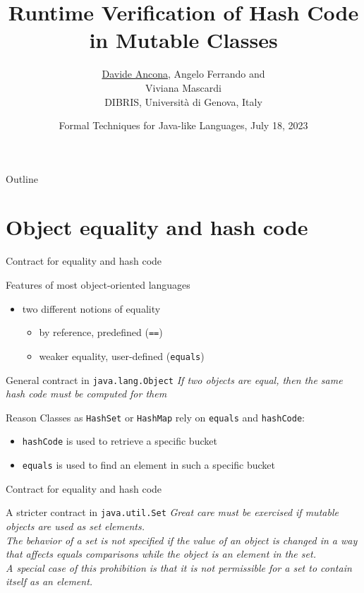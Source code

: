 \documentclass[10pt,usenames,dvipsnames]{beamer}
\title[Runtime Verification of Hash Code in Mutable Classes]{Runtime Verification of Hash Code in Mutable Classes}
\author[D. Ancona]{\underline{Davide Ancona}, Angelo Ferrando and \\ Viviana Mascardi \\[1ex]
  \small DIBRIS, Universit\`a di Genova, Italy}
\institute[]{DIBRIS, Universit\`a di Genova, Italy}
\date[FTfJP23]{Formal Techniques for Java-like Languages, July 18, 2023}
\begin{document}

\begin{frame}{Outline}
\tableofcontents%
\end{frame}

\section{Object equality and hash code}

\begin{frame}{Contract for equality and hash code}
  \begin{block}{Features of most object-oriented languages}
    \begin{itemize}
    \item two different notions of equality
      \begin{itemize}
      \item by reference, predefined (\lstinline{==})
      \item weaker equality, user-defined (\lstinline{equals})
      \end{itemize}
    \end{itemize}
  \end{block}

  \begin{block}{General contract in \lstinline{java.lang.Object}}
    \emph{If two objects are equal, then the same hash code must be computed for them}
  \end{block}

    \begin{block}{Reason}
      Classes as \lstinline{HashSet} or \lstinline{HashMap} rely on \lstinline{equals} and \lstinline{hashCode}:
      \begin{itemize}
      \item \lstinline{hashCode} is used to retrieve a specific bucket
      \item \lstinline{equals} is used to find an element in such a specific bucket        
        \end{itemize}
  \end{block}

\end{frame}


\begin{frame}{Contract for equality and hash code}
  \begin{block}{A stricter contract in \lstinline{java.util.Set}}
    \emph{Great care must be exercised if mutable objects are used as set elements.}\\[1ex]
    \emph{The behavior of a set is not specified if the value of an object is changed in a way that affects equals comparisons while the object is an element in the set.} \\[1ex]
    \emph{A special case of this prohibition is that it is not permissible for a set to contain itself as an element.} 
  \end{block}
\end{frame}
\end{document}

